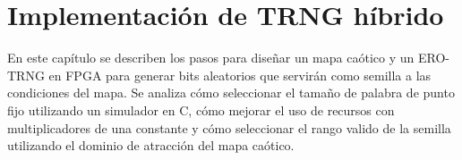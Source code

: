 \chapter{Implementación de TRNG híbrido}

    En este capítulo se describen los pasos para diseñar un mapa caótico y un ERO-TRNG en FPGA para generar bits aleatorios que servirán como semilla a las condiciones del mapa. Se analiza cómo seleccionar el tamaño de palabra de punto fijo utilizando un simulador en C, cómo mejorar el uso de recursos con multiplicadores de una constante y cómo seleccionar el rango valido de la semilla utilizando el dominio de atracción del mapa caótico.

   